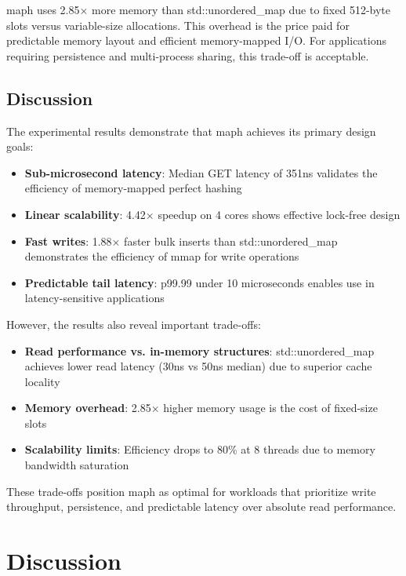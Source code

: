 \documentclass[10pt,conference]{IEEEtran}
\begin{document}
maph uses 2.85× more memory than std::unordered\_map due to fixed 512-byte slots versus variable-size allocations. This overhead is the price paid for predictable memory layout and efficient memory-mapped I/O. For applications requiring persistence and multi-process sharing, this trade-off is acceptable.

\subsection{Discussion}

The experimental results demonstrate that maph achieves its primary design goals:

\begin{itemize}
\item \textbf{Sub-microsecond latency}: Median GET latency of 351ns validates the efficiency of memory-mapped perfect hashing
\item \textbf{Linear scalability}: 4.42× speedup on 4 cores shows effective lock-free design
\item \textbf{Fast writes}: 1.88× faster bulk inserts than std::unordered\_map demonstrates the efficiency of mmap for write operations
\item \textbf{Predictable tail latency}: p99.99 under 10 microseconds enables use in latency-sensitive applications
\end{itemize}

However, the results also reveal important trade-offs:

\begin{itemize}
\item \textbf{Read performance vs. in-memory structures}: std::unordered\_map achieves lower read latency (30ns vs 50ns median) due to superior cache locality
\item \textbf{Memory overhead}: 2.85× higher memory usage is the cost of fixed-size slots
\item \textbf{Scalability limits}: Efficiency drops to 80\% at 8 threads due to memory bandwidth saturation
\end{itemize}

These trade-offs position maph as optimal for workloads that prioritize write throughput, persistence, and predictable latency over absolute read performance.

\section{Discussion}
\label{sec:discussion}
\end{document}
